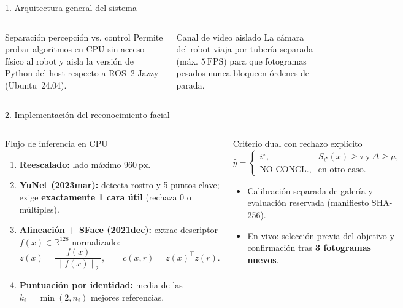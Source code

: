 \documentclass[aspectratio=169,10pt]{beamer}
\begin{document}
\begin{frame}{1. Arquitectura general del sistema}
  \vspace{0.35em}
  \footnotesize
  \begin{columns}[T,onlytextwidth]
    \begin{block}{Separación percepción vs. control}
      Permite probar algoritmos en CPU sin acceso físico al robot y aisla la
      versión de Python del host respecto a ROS~2 Jazzy (Ubuntu~24.04).
    \end{block}
    \begin{block}{Canal de video aislado}
      La cámara del robot viaja por tubería separada (máx. $5\ \mathrm{FPS}$)
      para que fotogramas pesados nunca bloqueen órdenes de parada.
    \end{block}
  \end{columns}
\end{frame}

\begin{frame}{2. Implementación del reconocimiento facial}
  \footnotesize
  \begin{columns}[T,onlytextwidth]
    \begin{block}{Flujo de inferencia en CPU}
      \begin{enumerate}
        \item \textbf{Reescalado:} lado máximo $960\ \mathrm{px}$.
        \item \textbf{YuNet (2023mar):} detecta rostro y 5 puntos clave; exige \textbf{exactamente 1 cara útil} (rechaza 0 o múltiples).
        \item \textbf{Alineación + SFace (2021dec):} extrae descriptor $f(x)\in\mathbb{R}^{128}$ normalizado:
        \[
          z(x)=\frac{f(x)}{\lVert f(x)\rVert_2}, \qquad c(x,r)=z(x)^\top z(r).
        \]
        \item \textbf{Puntuación por identidad:} media de las $k_i=\min(2,n_i)$ mejores referencias.
      \end{enumerate}
    \end{block}

    \begin{block}{Criterio dual con rechazo explícito}
      \[
        \widehat y =
        \begin{cases}
          i^\star, & S_{i^\star}(x)\ge\tau\ \text{y}\ \Delta\ge\mu,\\
          \text{NO\_CONCL.}, & \text{en otro caso}.
        \end{cases}
      \]
      \begin{itemize}
        \item Calibración separada de galería y evaluación reservada (manifiesto SHA-256).
        \item En vivo: selección previa del objetivo y confirmación tras \textbf{3 fotogramas nuevos}.
      \end{itemize}
    \end{block}
  \end{columns}
\end{frame}
\end{document}
